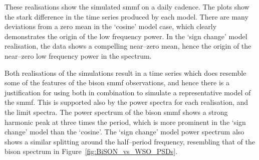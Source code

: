 These realisations show the simulated \gls{smmf} on a daily cadence. The plots show the stark difference in the time series produced by each model. There are many deviations from a zero mean in the `cosine' model case, which clearly demonstrates the origin of the low frequency power. In the `sign change' model realisation, the data shows a compelling near--zero mean, hence the origin of the near--zero low frequency power in the spectrum.

Both realisations of the simulations result in a time series which does resemble some of the features of the \gls{bison} \gls{smmf} observations, and hence there is a justification for using both in combination to simulate a representative model of the \gls{smmf}. This is supported also by the power spectra for each realisation, and the limit spectra. The power spectrum of the \gls{bison} \gls{smmf} shows a strong harmonic peak at three times the period, which is more prominent in the `sign change' model than the `cosine'. The `sign change' model power spectrum also shows a similar splitting around the half--period frequency, resembling that of the \gls{bison} spectrum in Figure~\ref{fig:BiSON_vs_WSO_PSDs}.
